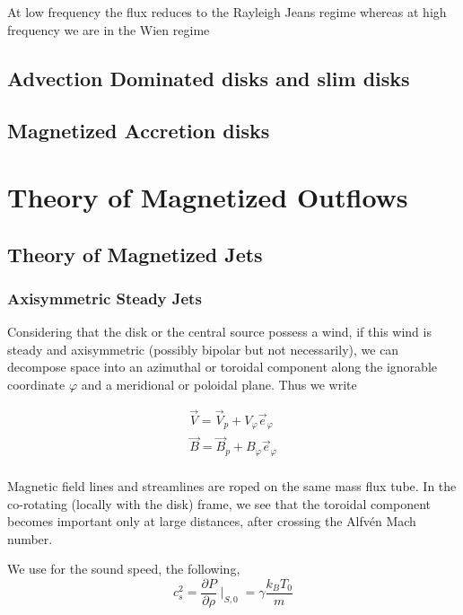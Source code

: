 \documentclass[10pt,a4paper,english]{article}
\begin{document}
At low frequency the flux reduces to the Rayleigh Jeans regime whereas at high
frequency we are in the Wien regime

\subsection{Advection Dominated disks and slim disks}
\subsection{Magnetized Accretion disks}

\section{Theory of Magnetized Outflows}
\subsection{Theory of Magnetized Jets}
\subsubsection{Axisymmetric Steady Jets}

Considering that the disk or the central source possess a wind, if this wind is steady and axisymmetric (possibly bipolar but not necessarily), we can decompose space into an azimuthal or toroidal component along the ignorable coordinate $\varphi$ and a meridional or poloidal plane. Thus we write

\begin{align*}
    \overrightarrow{V} = \overrightarrow{V}_{p} + V_{\varphi}\overrightarrow{e}_{\varphi} \\
    \overrightarrow{B} = \overrightarrow{B}_{p} + B_{\varphi}\overrightarrow{e}_{\varphi}  \\
\end{align*}

Magnetic field lines and streamlines are roped on the same mass flux tube. In the co-rotating (locally with the disk) frame, we see that the toroidal component becomes important only at large distances, after crossing the Alfvén Mach number. 
\\

We use for the sound speed, the following,
\begin{equation}
   c^{2}_{s} = \frac{\partial P}{\partial\rho}\mid_{S,0} = \gamma \frac{k_{B}T_{0}}{m}
\end{equation}
\end{document}
